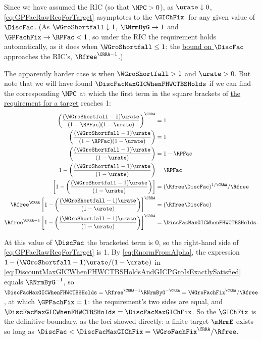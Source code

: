 \documentclass{econark}
\begin{document}
Since we have assumed the RIC (so that $\MPC > 0$), as $\urate \downarrow 0$, \eqref{eq:GPFacRawReqForTarget} asymptotes to the $\GIChFix$~for any given value of $\DiscFac$.  (As $\WGroShortfall \downarrow 1$, $\RNrmByG \rightarrow 1$ and $\GPFachFix \rightarrow \RPFac < 1$, so under the RIC the requirement holds automatically, as it does when $\WGroShortfall \leq 1$; the \hyperref[eq:DiscountMaxGICWhenFHWCTBSHoldsAndGICPGroIsExactlySatisfied]{bound on $\DiscFac$} approaches the RIC's, $\Rfree^{\CRRA-1}$.)  

The apparently harder case is when $\WGroShortfall>1$ and $\urate > 0$.  But note that we will have found $\DiscFacMaxGICWhenFHWCTBSHolds$ if we can find the corresponding $\MPC$ at which the first term in the square brackets of \hyperref[eq:GPFacRawReqForTarget]{the requirement for a target} reaches 1:
\begin{equation}\begin{gathered}\begin{aligned}
    \left(\frac{(\WGroShortfall-1)\urate}{(1-\RPFac) (1-\urate)}\right)^{\CRRA} & =  1
\\  \left(\frac{(\WGroShortfall-1)\urate}{(1-\RPFac) (1-\urate)}\right) & =  1
\\  \left(\frac{(\WGroShortfall-1)\urate}{ (1-\urate)}\right) & =  1-\RPFac
\\  1-\left(\frac{(\WGroShortfall-1)\urate}{ (1-\urate)}\right) & =  \RPFac
\\                  \left[1-\left(\frac{(\WGroShortfall-1)\urate}{ (1-\urate)}\right)\right] & =  (\Rfree \DiscFac)^{1/\CRRA}/\Rfree
\\  \Rfree^{\CRRA}  \left[1-\left(\frac{(\WGroShortfall-1)\urate}{ (1-\urate)}\right)\right]^{\CRRA} & =  (\Rfree \DiscFac)
\\  \Rfree^{\CRRA-1}\left[1-\left(\frac{(\WGroShortfall-1)\urate}{ (1-\urate)}\right)\right]^{\CRRA} & =  \DiscFacMaxGICWhenFHWCTBSHolds \label{eq:DiscountMaxGICWhenFHWCTBSHoldsAndGICPGroIsExactlySatisfied}
.\end{aligned}\end{gathered}\end{equation}

At this value of $\DiscFac$ the bracketed term is 0, so the right-hand side of \eqref{eq:GPFacRawReqForTarget} is 1.  By \eqref{eq:RnormFromAlpha}, the expression $1-(\WGroShortfall-1)\urate/(1-\urate)$ in \eqref{eq:DiscountMaxGICWhenFHWCTBSHoldsAndGICPGroIsExactlySatisfied} equals $\RNrmByG^{-1}$, so $\DiscFacMaxGICWhenFHWCTBSHolds = \Rfree^{\CRRA-1}\RNrmByG^{-\CRRA} = \WGroFachFix^{\CRRA}/\Rfree$, at which $\GPFachFix = 1$: the requirement's two sides are equal, and $\DiscFacMaxGICWhenFHWCTBSHolds=\DiscFacMaxGIChFix$.  So the $\GIChFix$ is the definitive boundary, as the loci showed directly: a finite target $\mNrmE$ exists so long as $\DiscFac < \DiscFacMaxGIChFix = \WGroFachFix^{\CRRA}/\Rfree$.
\end{document}
